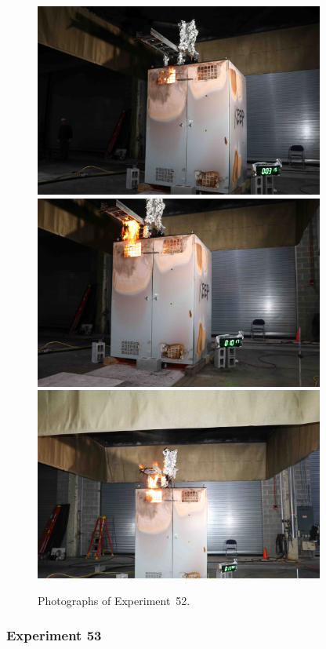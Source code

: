 \begin{figure}[p]
\centering
\includegraphics[height=2.50in]{../FIGURES/Test_52_3_min_15_s} \\
\includegraphics[height=2.50in]{../FIGURES/Test_52_10_min_17_s} \\
\includegraphics[height=2.50in]{../FIGURES/Test_52_11_min_50_s}
\caption[Photographs of Experiment~52]{Photographs of Experiment~52.}
\label{fig:Test_52_photos}
\end{figure}


\clearpage

\subsubsection{Experiment 53}

